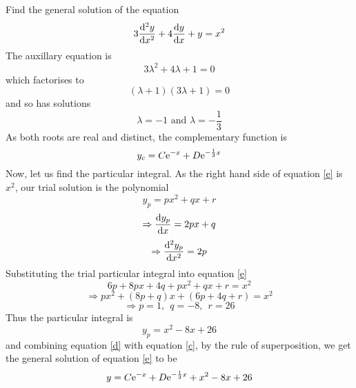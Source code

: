 \documentclass[a4paper,12pt]{article}
\begin{document}
\begin{question}[3]
Find the general solution of the equation
\begin{equation}
\label{e}
3\frac{\mathrm{d}^2y}{\mathrm{d}x^2}+4\frac{\mathrm{d}y}{\mathrm{d}x}+y=x^2
\end{equation}
The auxillary equation is
\begin{equation}
3\lambda^2+4\lambda+1=0
\end{equation}
which factorises to
\begin{equation}
(\lambda+1)(3\lambda+1)=0
\end{equation}
and so has solutions
\begin{equation}
\lambda=-1 \mbox{\ and\ }\lambda=-\frac{1}{3}
\end{equation}
As both roots are real and distinct, the complementary function is
\begin{equation}
\label{d}
y_c=C\mathrm{e}^{-x}+D\mathrm{e}^{-\frac{1}{3}x}
\end{equation}
Now, let us find the particular integral.  As the right hand side of equation \ref{e} is $x^2$, our trial solution is the polynomial
\begin{equation}
y_p=px^2+qx+r
\end{equation}
\begin{equation}
\Rightarrow \frac{\mathrm{d}y_p}{\mathrm{d}x}=2px+q
\end{equation}
\begin{equation}
\Rightarrow \frac{\mathrm{d}^2y_p}{\mathrm{d}x^2}=2p
\end{equation}
Substituting the trial particular integral into equation \ref{e}
\begin{equation}
6p+8px+4q+px^2+qx+r=x^2
\end{equation}
\begin{equation}
\Rightarrow px^2+(8p+q)x+(6p+4q+r)=x^2
\end{equation}
\begin{equation}
\Rightarrow p=1,\ \ q=-8,\ \ r=26
\end{equation}
Thus the particular integral is
\begin{equation}
\label{c}
y_p=x^2-8x+26
\end{equation}
and combining equation \ref{d} with equation \ref{c}, by the rule of superposition, we get the general solution of equation \ref{e} to be
\begin{equation}
y=C\mathrm{e}^{-x}+D\mathrm{e}^{-\frac{1}{3}x}+x^2-8x+26
\end{equation}
\end{question}
\end{document}
